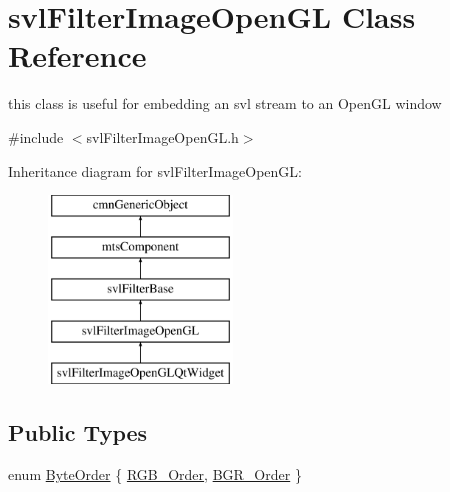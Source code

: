 \hypertarget{classsvl_filter_image_open_g_l}{}\section{svl\+Filter\+Image\+Open\+G\+L Class Reference}
\label{classsvl_filter_image_open_g_l}


this class is useful for embedding an svl stream to an Open\+G\+L window  




{\ttfamily \#include $<$svl\+Filter\+Image\+Open\+G\+L.\+h$>$}

Inheritance diagram for svl\+Filter\+Image\+Open\+G\+L\+:\begin{figure}[H]
\begin{center}
\leavevmode
\includegraphics[height=5.000000cm]{d3/dcf/classsvl_filter_image_open_g_l}
\end{center}
\end{figure}
\subsection*{Public Types}
\begin{DoxyCompactItemize}
\item 
enum \hyperlink{classsvl_filter_image_open_g_l_aebab8852e9b2fd8bc2fb69c7ce788d3f}{Byte\+Order} \{ \hyperlink{classsvl_filter_image_open_g_l_aebab8852e9b2fd8bc2fb69c7ce788d3fa0a28f9264131c7b9b5ec54c0497091f3}{R\+G\+B\+\_\+\+Order}, 
\hyperlink{classsvl_filter_image_open_g_l_aebab8852e9b2fd8bc2fb69c7ce788d3faf5fa66f50f54a7febaa882e293c97526}{B\+G\+R\+\_\+\+Order}
 \}
\end{DoxyCompactItemize}
